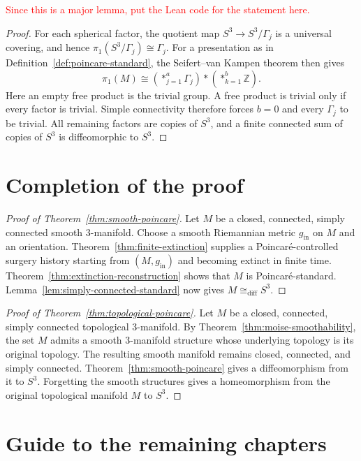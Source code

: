 \documentclass[10pt]{coll-l}
\newcommand{\diffeo}{\mathrel{\cong_{\mathrm{diff}}}}
\theoremstyle{definition}
\theoremstyle{remark}
\numberwithin{section}{chapter}
\numberwithin{equation}{chapter}
\begin{document}
\textcolor{red}{Since this is a major lemma, put the Lean code for the statement here.}

\begin{proof}
For each spherical factor, the quotient map
$S^{3}\to S^{3}/\Gamma_j$ is a universal covering, and hence
$\pi_1(S^{3}/\Gamma_j)\cong\Gamma_j$.  For a presentation as in
Definition~\ref{def:poincare-standard}, the Seifert--van Kampen theorem then
gives
\[
  \pi_{1}(M)
  \cong
  \left(\mathop{\ast}_{j=1}^{a}\Gamma_j\right)
  \ast
  \left(\mathop{\ast}_{k=1}^{b}\mathbb Z\right).
\]
Here an empty free product is the trivial group.
A free product is trivial only if every factor is trivial.  Simple
connectivity therefore forces $b=0$ and every $\Gamma_j$ to be trivial.  All
remaining factors are copies of $S^{3}$, and a finite connected sum of copies
of $S^{3}$ is diffeomorphic to $S^{3}$.
\end{proof}

\section{Completion of the proof}

\begin{proof}[Proof of Theorem~\ref{thm:smooth-poincare}]
Let $M$ be a closed, connected, simply connected smooth $3$-manifold.  Choose
a smooth Riemannian metric $g_{\mathrm{in}}$ on $M$ and an orientation.
Theorem~\ref{thm:finite-extinction} supplies a Poincar\'e-controlled surgery
history starting from $(M,g_{\mathrm{in}})$ and becoming extinct in finite
time.  Theorem~\ref{thm:extinction-reconstruction} shows that $M$ is
Poincar\'e-standard.  Lemma~\ref{lem:simply-connected-standard} now gives
$M\diffeo S^{3}$.
\end{proof}

\begin{proof}[Proof of Theorem~\ref{thm:topological-poincare}]
Let $M$ be a closed, connected, simply connected topological $3$-manifold.
By Theorem~\ref{thm:moise-smoothability}, the set $M$ admits a smooth
$3$-manifold structure whose underlying topology is its original topology.
The resulting smooth manifold remains closed, connected, and simply
connected.  Theorem~\ref{thm:smooth-poincare} gives a diffeomorphism from it
to $S^{3}$.  Forgetting the smooth structures gives a homeomorphism from the
original topological manifold $M$ to $S^{3}$.
\end{proof}

\section{Guide to the remaining chapters}
\end{document}
